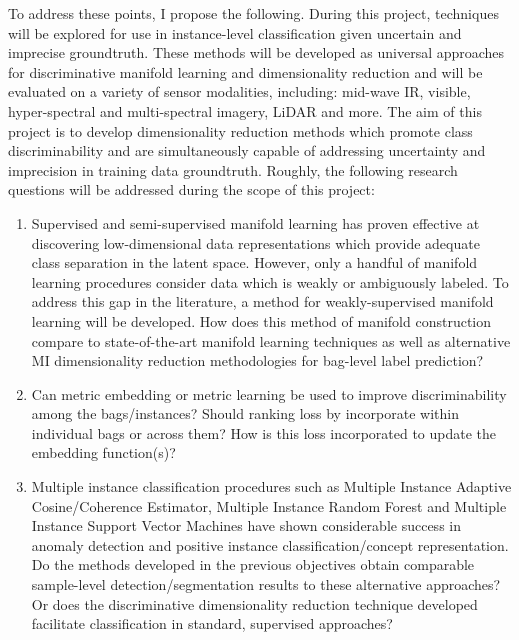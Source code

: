 To address these points, I propose the following.  During this project, techniques will be explored for use in instance-level classification given uncertain and imprecise groundtruth.  These methods will be developed as universal approaches for discriminative manifold learning and dimensionality reduction and will be evaluated on a variety of sensor modalities, including: mid-wave IR, visible, hyper-spectral and multi-spectral imagery, LiDAR and more.  The aim of this project is to develop dimensionality reduction methods which promote class discriminability and are simultaneously capable of addressing uncertainty and imprecision in training data groundtruth. Roughly, the following research questions will be addressed during the scope of this project:
\begin{enumerate}
	\item Supervised and semi-supervised manifold learning has proven effective at discovering low-dimensional data representations which provide adequate class separation in the latent space.  However, only a handful of manifold learning procedures consider data which is weakly or ambiguously labeled.  To address this gap in the literature, a method for weakly-supervised manifold learning will be developed. How does this method of manifold construction compare to state-of-the-art manifold learning techniques as well as alternative MI dimensionality reduction methodologies for bag-level label prediction?
	\item Can metric embedding or metric learning be used to improve discriminability among the bags/instances?   Should ranking loss by incorporate within individual bags or across them?  How is this loss incorporated to update the embedding function(s)?
	\item Multiple instance classification procedures such as Multiple Instance Adaptive Cosine/Coherence Estimator, Multiple Instance Random Forest and Multiple Instance Support Vector Machines have shown considerable success in anomaly detection and positive instance classification/concept representation. Do the methods developed in the previous objectives obtain comparable sample-level detection/segmentation results to these alternative approaches?  Or does the discriminative dimensionality reduction technique developed facilitate classification in standard, supervised approaches?
\end{enumerate} 

